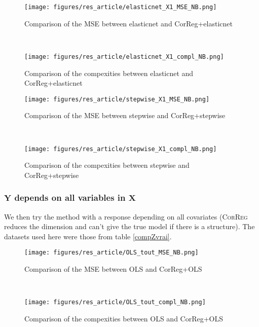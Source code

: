 \documentclass[11pt,a4paper]{report}
\begin{document}
 \begin{figure}[h!]
	\begin{minipage}[l]{.48\linewidth}
			\texttt{[image: figures/res\_article/elasticnet\_X1\_MSE\_NB.png]} 
			\caption{Comparison of the MSE between elasticnet and CorReg+elasticnet}
	\end{minipage} \
   \begin{minipage}[r]{.48\linewidth}
			\texttt{[image: figures/res\_article/elasticnet\_X1\_compl\_NB.png]} 
			\caption{Comparison of the compexities between elasticnet and CorReg+elasticnet} 
   \end{minipage}
\end{figure}

 \begin{figure}[h!]
	\begin{minipage}[l]{.48\linewidth}
			\texttt{[image: figures/res\_article/stepwise\_X1\_MSE\_NB.png]} 
			\caption{Comparison of the MSE between stepwise and CorReg+stepwise}
	\end{minipage} \
   \begin{minipage}[r]{.48\linewidth}
			\texttt{[image: figures/res\_article/stepwise\_X1\_compl\_NB.png]} 
			\caption{Comparison of the compexities between stepwise and CorReg+stepwise} 
   \end{minipage}
\end{figure}

\clearpage
	\subsubsection{$\boldsymbol{Y}$ depends on all variables in $\boldsymbol{X}$}	 	
We then try the method with a response depending on all covariates (\textsc{CorReg} reduces the dimension and can't give the true model if there is a structure). The datasets used here were those from table \ref{compZvrai}. 
 
 
 \begin{figure}[h!]
	\begin{minipage}[l]{.48\linewidth}
			\texttt{[image: figures/res\_article/OLS\_tout\_MSE\_NB.png]} 
			\caption{Comparison of the MSE between OLS and CorReg+OLS}
	\end{minipage} \
   \begin{minipage}[r]{.48\linewidth}
			\texttt{[image: figures/res\_article/OLS\_tout\_compl\_NB.png]} 
			\caption{Comparison of the compexities between OLS and CorReg+OLS} 
   \end{minipage}
\end{figure}
 
\end{document}
